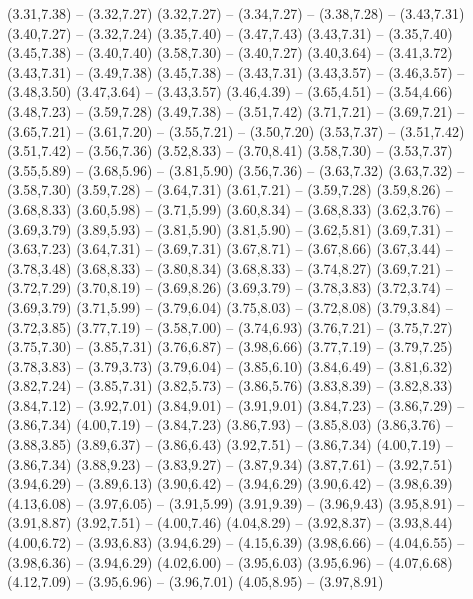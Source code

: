 {  (3.31,7.38) -- (3.32,7.27)
  (3.32,7.27) -- (3.34,7.27) -- (3.38,7.28) -- (3.43,7.31)
  (3.40,7.27) -- (3.32,7.24)
  (3.35,7.40) -- (3.47,7.43)
  (3.43,7.31) -- (3.35,7.40)
  (3.45,7.38) -- (3.40,7.40)
  (3.58,7.30) -- (3.40,7.27)
  (3.40,3.64) -- (3.41,3.72)
  (3.43,7.31) -- (3.49,7.38)
  (3.45,7.38) -- (3.43,7.31)
  (3.43,3.57) -- (3.46,3.57) -- (3.48,3.50)
  (3.47,3.64) -- (3.43,3.57)
  (3.46,4.39) -- (3.65,4.51) -- (3.54,4.66)
  (3.48,7.23) -- (3.59,7.28)
  (3.49,7.38) -- (3.51,7.42)
  (3.71,7.21) -- (3.69,7.21) -- (3.65,7.21) -- (3.61,7.20) -- (3.55,7.21) -- (3.50,7.20)
  (3.53,7.37) -- (3.51,7.42)
  (3.51,7.42) -- (3.56,7.36)
  (3.52,8.33) -- (3.70,8.41)
  (3.58,7.30) -- (3.53,7.37)
  (3.55,5.89) -- (3.68,5.96) -- (3.81,5.90)
  (3.56,7.36) -- (3.63,7.32)
  (3.63,7.32) -- (3.58,7.30)
  (3.59,7.28) -- (3.64,7.31)
  (3.61,7.21) -- (3.59,7.28)
  (3.59,8.26) -- (3.68,8.33)
  (3.60,5.98) -- (3.71,5.99)
  (3.60,8.34) -- (3.68,8.33)
  (3.62,3.76) -- (3.69,3.79)
  (3.89,5.93) -- (3.81,5.90)
  (3.81,5.90) -- (3.62,5.81)
  (3.69,7.31) -- (3.63,7.23)
  (3.64,7.31) -- (3.69,7.31)
  (3.67,8.71) -- (3.67,8.66)
  (3.67,3.44) -- (3.78,3.48)
  (3.68,8.33) -- (3.80,8.34)
  (3.68,8.33) -- (3.74,8.27)
  (3.69,7.21) -- (3.72,7.29)
  (3.70,8.19) -- (3.69,8.26)
  (3.69,3.79) -- (3.78,3.83)
  (3.72,3.74) -- (3.69,3.79)
  (3.71,5.99) -- (3.79,6.04)
  (3.75,8.03) -- (3.72,8.08)
  (3.79,3.84) -- (3.72,3.85)
  (3.77,7.19) -- (3.58,7.00) -- (3.74,6.93)
  (3.76,7.21) -- (3.75,7.27)
  (3.75,7.30) -- (3.85,7.31)
  (3.76,6.87) -- (3.98,6.66)
  (3.77,7.19) -- (3.79,7.25)
  (3.78,3.83) -- (3.79,3.73)
  (3.79,6.04) -- (3.85,6.10)
  (3.84,6.49) -- (3.81,6.32)
  (3.82,7.24) -- (3.85,7.31)
  (3.82,5.73) -- (3.86,5.76)
  (3.83,8.39) -- (3.82,8.33)
  (3.84,7.12) -- (3.92,7.01)
  (3.84,9.01) -- (3.91,9.01)
  (3.84,7.23) -- (3.86,7.29) -- (3.86,7.34)
  (4.00,7.19) -- (3.84,7.23)
  (3.86,7.93) -- (3.85,8.03)
  (3.86,3.76) -- (3.88,3.85)
  (3.89,6.37) -- (3.86,6.43)
  (3.92,7.51) -- (3.86,7.34)
  (4.00,7.19) -- (3.86,7.34)
  (3.88,9.23) -- (3.83,9.27) -- (3.87,9.34)
  (3.87,7.61) -- (3.92,7.51)
  (3.94,6.29) -- (3.89,6.13)
  (3.90,6.42) -- (3.94,6.29)
  (3.90,6.42) -- (3.98,6.39)
  (4.13,6.08) -- (3.97,6.05) -- (3.91,5.99)
  (3.91,9.39) -- (3.96,9.43)
  (3.95,8.91) -- (3.91,8.87)
  (3.92,7.51) -- (4.00,7.46)
  (4.04,8.29) -- (3.92,8.37) -- (3.93,8.44)
  (4.00,6.72) -- (3.93,6.83)
  (3.94,6.29) -- (4.15,6.39)
  (3.98,6.66) -- (4.04,6.55) -- (3.98,6.36) -- (3.94,6.29)
  (4.02,6.00) -- (3.95,6.03)
  (3.95,6.96) -- (4.07,6.68)
  (4.12,7.09) -- (3.95,6.96) -- (3.96,7.01)
  (4.05,8.95) -- (3.97,8.91)
}

